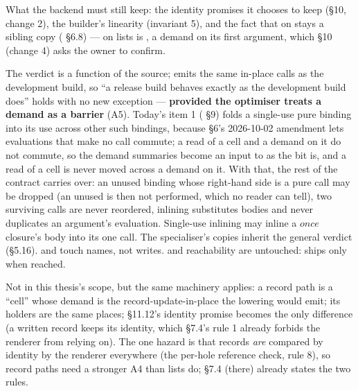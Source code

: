 What the backend must still keep: the identity promises it chooses to keep (§10, change 2), the builder's linearity (invariant 5), and the fact that  on  stays a sibling copy ( §6.8) — \code{++} on lists is , a demand on its first argument, which §10 (change 4) asks the owner to confirm.


The verdict is a function of the source;  emits the same in-place calls as the development build, so “a release build behaves exactly as the development build does” holds with no new exception — \textbf{provided the optimiser treats a demand as a barrier} (A5). Today's item 1 ( §9) folds a single-use pure binding into its use across other such bindings, because  §6's 2026-10-02 amendment lets evaluations that make no call commute; a read of a cell and a demand on it do not commute, so the demand summaries become an input to  as the  bit is, and a read of a cell is never moved across a demand on it. With that, the rest of the contract carries over: an unused binding whose right-hand side is a pure call may be dropped (an unused  is then not performed, which no reader can tell), two surviving calls are never reordered, inlining substitutes bodies and never duplicates an argument's evaluation. Single-use inlining may inline a $\mathit{once}$ closure's body into its one call. The specialiser's copies inherit the general verdict (§5.16).  and  touch names, not writes.  and reachability are untouched:  ships only when reached.


Not in this thesis's scope, but the same machinery applies: a record path is a “cell” whose demand is the record-update-in-place the lowering would emit; its holders are the same places;  §11.12's identity promise becomes the only difference (a written record keeps its identity, which §7.4's rule 1 already forbids the renderer from relying on). The one hazard is that records \emph{are} compared by identity by the renderer everywhere (the per-hole reference check, rule 8), so record paths need a stronger A4 than lists do; §7.4 (there) already states the two rules.


